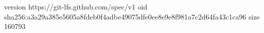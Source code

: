 version https://git-lfs.github.com/spec/v1
oid sha256:a3a29a385e5605a8fdeb0f4adbe49075dfe0ee8e9e8f981a7c2d64fa43c1ca96
size 160793

